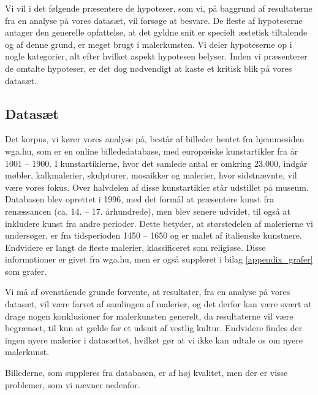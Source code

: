 {
{\sffamily Vi vil i det følgende præsentere de hypoteser, som vi, på
baggrund af resultaterne fra en analyse på vores datasæt, vil forsøge at
besvare. De fleste af hypoteserne antager den generelle opfattelse, at
det gyldne snit er specielt æstetisk tiltalende og af denne grund, er
meget brugt i malerkunsten. Vi deler hypoteserne op i nogle kategorier,
alt efter hvilket aspekt hypotesen belyser. Inden vi præsenterer de
omtalte hypoteser, er det dog nødvendigt at kaste et kritisk blik på
vores datasæt.
}

\subsection{Datasæt}
Det korpus, vi kører vores analyse på, består af billeder hentet fra
hjemmesiden wga.hu\cite{wgahu}, som er en online billededatabase, med
europæiske kunstartikler fra år 1001 -- 1900. I kunstartiklerne, hvor
det samlede antal er omkring 23.000, indgår møbler, kalkmalerier,
skulpturer, mosaikker og malerier, hvor sidstnævnte, vil være vores
fokus. Over halvdelen af disse kunstartikler står udstillet på museum.
Databasen blev oprettet i 1996, med det formål at præsentere kunst fra
renæssancen (ca.  14. -- 17.  århundrede), men blev senere udvidet, til
også at inkludere kunst fra andre perioder. Dette betyder, at
størstedelen af malerierne vi undersøger, er fra tidsperioden 1450 --
1650 og er malet af italienske kunstnere. Endvidere er langt de fleste
malerier, klassificeret som religiøse.  Disse informationer er givet fra
wga.hu, men er også suppleret i bilag \ref{appendix_grafer} som
grafer.

Vi må af ovenstående grunde forvente, at resultater, fra en analyse på
vores datasæt, vil være farvet af samlingen af malerier, og det derfor
kan være svært at drage nogen konklusioner for malerkunsten generelt, da
resultaterne vil være begrænset, til kun at gælde for et udsnit af
vestlig kultur. Endvidere findes der ingen nyere malerier i datasættet,
hvilket gør at vi ikke kan udtale os om nyere malerkunst.

Billederne, som suppleres fra databasen, er af høj kvalitet, men der er
visse problemer, som vi nævner nedenfor.

}
